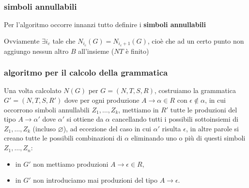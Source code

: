 \subsubsection{simboli annullabili}
Per l'algoritmo occorre innanzi tutto definire i \textbf{simboli annullabili}

Ovviamente $\exists i_c$ tale che $N_{i_c}(G)=N_{i_c+1}(G)$, cioè che ad un certo punto non aggiungo nessun altro $B$ all'insieme ($NT$ è finito)

\subsubsection{algoritmo per il calcolo della grammatica}


Una volta calcolato \( N(G) \) per \( G = (N, T, S, R) \), costruiamo la grammatica \( G' = (N, T, S, R') \) dove per ogni produzione \( A \rightarrow \alpha \in R \) con \( \epsilon \not\in \alpha \), in cui occorrono simboli annullabili \( Z_1, \ldots, Z_k \), mettiamo in \( R' \) tutte le produzioni del tipo \( A \rightarrow \alpha' \) dove \( \alpha' \) si ottiene da \( \alpha \) cancellando tutti i possibili sottoinsiemi di \( Z_1, \ldots, Z_k \) (incluso \( \varnothing \)), ad eccezione del caso in cui \( \alpha' \) risulta \( \epsilon \), in altre parole si creano tutte le possibili combinazioni di $\alpha$ eliminando uno o più di questi simboli $Z_1,\dots,Z_n$:

\begin{itemize}
    \item in \( G' \) non mettiamo produzioni \( A \rightarrow \epsilon \in R \),
    \item in \( G' \) non introduciamo mai produzioni del tipo \( A \rightarrow \epsilon \).
\end{itemize}

